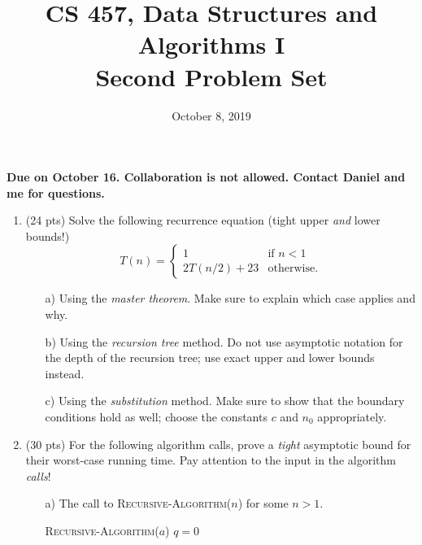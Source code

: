 \documentclass{article}
\begin{document}
\title{CS 457, Data Structures and Algorithms I\\
Second Problem Set}
\date{October 8, 2019}
\maketitle
\begin{center}
\textbf{Due on October 16. Collaboration is \textbf{not} allowed. Contact Daniel and me for questions.}
\end{center}
\begin{enumerate}


\item (24 pts)
Solve the following recurrence equation (tight upper \emph{and} lower bounds!)
\begin{equation*}
T(n)=
\begin{cases}
1 &\text{if $n< 1$}\\
2T(n/2)+23 &\text{otherwise.}
\end{cases}
\end{equation*}

\begin{itemize}
\item [a)] Using the \emph{master theorem}. Make sure to explain which case applies and why.
\item [b)] Using the \emph{recursion tree} method. Do not use asymptotic notation for the depth of the recursion tree; use exact upper and lower bounds instead. 
\item [c)] Using the \emph{substitution} method. Make sure to show that the boundary conditions hold as well; choose the constants $c$ and $n_0$ appropriately.
\end{itemize}



\item (30 pts)
For the following algorithm calls, prove a {\em tight} asymptotic bound for their worst-case running time. Pay attention to the input in the algorithm \emph{calls}!

\begin{itemize}
\item [a)] The call to \textsc{Recursive-Algorithm}($n$) for some $n>1$.
\vspace{10pt}

\begin{algorithm}[H]
\textsc{Recursive-Algorithm}($a$)\;
$q=0$\;
\end{algorithm}
\end{itemize}
\end{enumerate}
\end{document}
